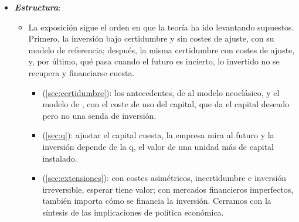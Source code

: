 \documentclass[11pt]{article}
\begin{document}
\begin{itemize}
\item \textbf{\emph{Estructura}}:
  \begin{itemize}
  \item La exposición sigue el orden en que la teoría ha ido levantando supuestos. Primero, la inversión bajo certidumbre y sin costes de ajuste, con su modelo de referencia; después, la misma certidumbre con costes de ajuste, y, por último, qué pasa cuando el futuro es incierto, lo invertido no se recupera y financiarse cuesta.
  \begin{itemize}
  \item {} (\ref{sec:certidumbre}): los antecedentes, de  al modelo neoclásico, y el modelo de , con el coste de uso del capital, que da el capital deseado pero no una senda de inversión.
  \item {} (\ref{sec:q}): ajustar el capital cuesta, la empresa mira al futuro y la inversión depende de la q, el valor de una unidad más de capital instalado.
  \item {} (\ref{sec:extensiones}): con costes asimétricos, incertidumbre e inversión irreversible, esperar tiene valor; con mercados financieros imperfectos, también importa cómo se financia la inversión. Cerramos con la síntesis de las implicaciones de política económica.
  \end{itemize}
  \end{itemize}
\end{itemize}
\end{document}
